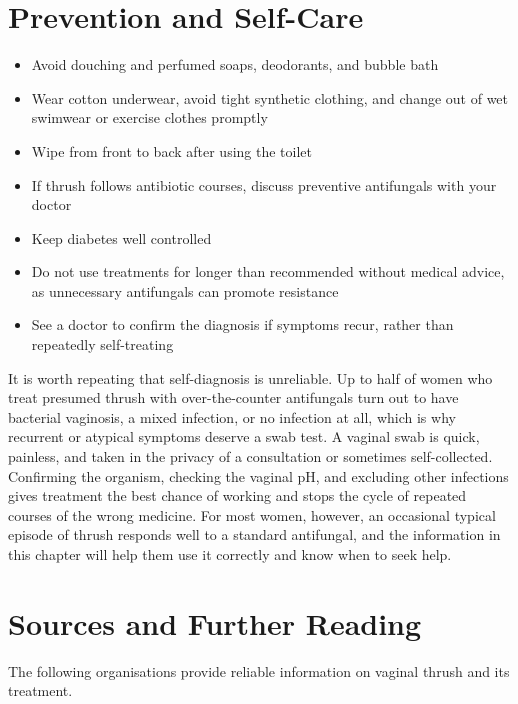 \section*{Prevention and Self-Care}
\begin{itemize}
    \item Avoid douching and perfumed soaps, deodorants, and bubble bath
    \item Wear cotton underwear, avoid tight synthetic clothing, and change out of wet swimwear or exercise clothes promptly
    \item Wipe from front to back after using the toilet
    \item If thrush follows antibiotic courses, discuss preventive antifungals with your doctor
    \item Keep diabetes well controlled
    \item Do not use treatments for longer than recommended without medical advice, as unnecessary antifungals can promote resistance
    \item See a doctor to confirm the diagnosis if symptoms recur, rather than repeatedly self-treating
\end{itemize}

It is worth repeating that self-diagnosis is unreliable. Up to half of women who treat presumed thrush with over-the-counter antifungals turn out to have bacterial vaginosis, a mixed infection, or no infection at all, which is why recurrent or atypical symptoms deserve a swab test. A vaginal swab is quick, painless, and taken in the privacy of a consultation or sometimes self-collected. Confirming the organism, checking the vaginal pH, and excluding other infections gives treatment the best chance of working and stops the cycle of repeated courses of the wrong medicine. For most women, however, an occasional typical episode of thrush responds well to a standard antifungal, and the information in this chapter will help them use it correctly and know when to seek help.

\section*{Sources and Further Reading}
The following organisations provide reliable information on vaginal thrush and its treatment.

